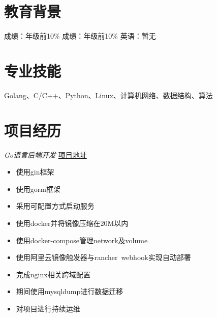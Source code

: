 \documentclass{uniquecv}
\begin{document}
\medskip



\section{教育背景}
成绩：年级前10\%
成绩：年级前10\% \quad 英语：暂无



\section{专业技能}
\smallskip
Golang、C/C++、Python、Linux、计算机网络、数据结构、算法




\section{项目经历}

\textit{Go语言后端开发}
\href{https://github.com/colinaaa/UniqueHackDayDashboard-backend}{项目地址}
\vspace{0.4ex}

\begin{itemize}
  \item 使用gin框架
  \item 使用gorm框架
  \item 采用可配置方式启动服务
  \item 使用docker并将镜像压缩在20M以内
  \item 使用docker-compose管理network及volume
  \item 使用阿里云镜像触发器与rancher\ webhook实现自动部署
  \item 完成nginx相关跨域配置
  \item 期间使用mysqldump进行数据迁移
  \item 对项目进行持续运维
\end{itemize}
\end{document}
